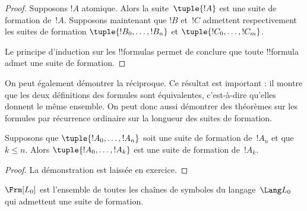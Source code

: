 \documentclass[../../../include/open-logic-section]{subfiles}
\begin{document}
\begin{proof}
Supposons $!A$ atomique. Alors la suite~$\tuple{!A}$ est une suite
de formation de~$!A$.
%
Supposons maintenant que $!B$ et~$!C$ admettent respectivement les
suites de formation $\tuple{!B_0,\dotsc,!B_n}$ et
$\tuple{!C_0,\dotsc,!C_m}$.
%
\begin{enumerate}
\end{enumerate}
Le principe d'induction sur les !!{formula}s permet de conclure que
toute !!{formula} admet une suite de formation.
\end{proof}

On peut également démontrer la réciproque. Ce résultat est important :
il montre que les deux définitions des formules sont équivalentes,
c'est-à-dire qu'elles donnent le même ensemble. On peut donc aussi
démontrer des théorèmes sur les formules par récurrence ordinaire
sur la longueur des suites de formation.

\begin{lem}
Supposons que $\tuple{!A_0,\dotsc,!A_n}$ soit une suite de formation
de~$!A_n$ et que $k \leq n$. Alors $\tuple{!A_0,\dotsc,!A_k}$ est
une suite de formation de~$!A_k$.
\end{lem}

\begin{proof}
La démonstration est laissée en exercice.
\end{proof}

\begin{thm}
$\Frm[L_0]$ est l'ensemble de toutes les chaînes de symboles du
langage~$\Lang L_0$ qui admettent une suite de formation.
\end{thm}
\end{document}
